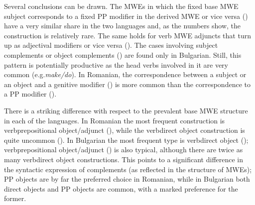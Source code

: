 \documentclass[output=paper]{langsci/langscibook}
\begin{document}
Several conclusions can be drawn. The MWEs in which the fixed base MWE
subject corresponds to a fixed PP modifier in the derived MWE or vice
versa () have a very similar share in the two languages
and, as the numbers show, the construction is relatively rare. The same
holds for verb MWE adjuncts that turn up as adjectival modifiers or
vice versa (). The cases involving subject complements or object
complements () are found only in Bulgarian. Still, this pattern is
potentially productive as the head verbs involved in it are very common
(e.g.\@ \textit{make/do}). In Romanian, the correspondence between a subject or
an object and a genitive modifier () is more common than the
correspondence to a PP modifier ().



There is a striking difference with respect to the prevalent base MWE
structure in each of the languages. In Romanian the most frequent
construction is verb\textendash prepositional object/adjunct (), while the
verb\textendash direct object construction is quite uncommon (). In Bulgarian
the most frequent type is verb\textendash direct object ();
verb\textendash prepositional object/adjunct () is also typical, although there are twice as many verb\textendash direct object constructions. This points to a significant difference in the
syntactic expression of complements (as reflected in the structure of
MWEs); PP objects are by far the preferred choice in Romanian, while in
Bulgarian both direct objects and PP objects are common, with a marked
preference for the former.



 
\end{document}

